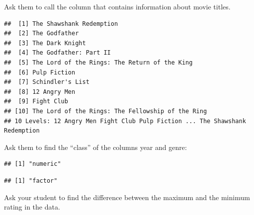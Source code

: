 \documentclass[]{book}
\newenvironment{Shaded}{\begin{snugshade}}{\end{snugshade}}
\newcommand{\KeywordTok}[1]{\textcolor[rgb]{0.13,0.29,0.53}{\textbf{#1}}}
\newcommand{\NormalTok}[1]{#1}
\newcommand{\OperatorTok}[1]{\textcolor[rgb]{0.81,0.36,0.00}{\textbf{#1}}}
\newcommand{\StringTok}[1]{\textcolor[rgb]{0.31,0.60,0.02}{#1}}
\begin{document}
Ask them to call the column that contains information about movie titles.

\begin{Shaded}
\end{Shaded}

\begin{verbatim}
##  [1] The Shawshank Redemption                         
##  [2] The Godfather                                    
##  [3] The Dark Knight                                  
##  [4] The Godfather: Part II                           
##  [5] The Lord of the Rings: The Return of the King    
##  [6] Pulp Fiction                                     
##  [7] Schindler's List                                 
##  [8] 12 Angry Men                                     
##  [9] Fight Club                                       
## [10] The Lord of the Rings: The Fellowship of the Ring
## 10 Levels: 12 Angry Men Fight Club Pulp Fiction ... The Shawshank Redemption
\end{verbatim}

Ask them to find the ``class'' of the columns year and genre:

\begin{Shaded}
\end{Shaded}

\begin{verbatim}
## [1] "numeric"
\end{verbatim}

\begin{Shaded}
\end{Shaded}

\begin{verbatim}
## [1] "factor"
\end{verbatim}

Ask your student to find the difference between the maximum and the minimum rating in the data.

\begin{Shaded}
\end{Shaded}
\end{document}
